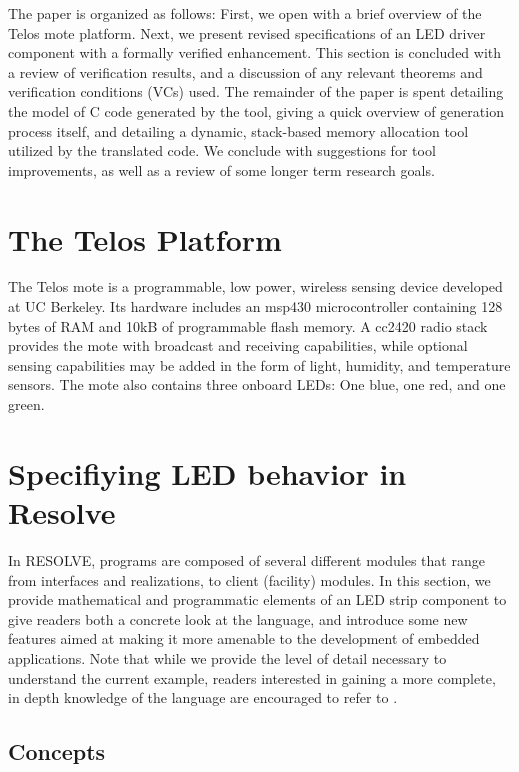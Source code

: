 \documentclass{sig-alternate}
\begin{document}
The paper is organized as follows: First, we open with a brief overview of the Telos mote platform. Next, we present revised specifications of an LED driver component with a formally verified enhancement. This section is concluded with a review of verification results, and a discussion of any relevant theorems and verification conditions (VCs) used. The remainder of the paper is spent detailing the model of C code generated by the tool, giving a quick overview of generation process itself, and detailing a dynamic, stack-based memory allocation tool utilized by the translated code. We conclude with suggestions for tool improvements, as well as a review of some longer term research goals.

\section{The Telos Platform}

The Telos mote \cite{polastre:2005} is a programmable, low power, wireless sensing device developed at UC Berkeley. Its hardware includes an msp430 microcontroller containing 128 bytes of RAM and 10kB of programmable flash memory. A cc2420 radio stack provides the mote with broadcast and receiving capabilities, while optional sensing capabilities may be added in the form of light, humidity, and temperature sensors. The mote also contains three onboard LEDs: One blue, one red, and one green.

\section{Specifiying LED behavior in Resolve}
\label{sec:specifiying}

In RESOLVE, programs are composed of several different modules that range from interfaces and realizations, to client (facility) modules. In this section, we provide mathematical and programmatic elements of an LED strip component to give readers both a concrete look at the language, and introduce some new features aimed at making it more amenable to the development of embedded applications. Note that while we provide the level of detail necessary to understand the current example, readers interested in gaining a more complete, in depth knowledge of the language are encouraged to refer to \cite{sitaraman:2011, kulczycki:2008}.

\subsection{Concepts}
\end{document}

